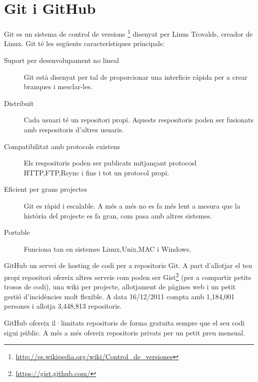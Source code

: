 \section{Git i GitHub}

Git es un sistema de control de versions \footnote{\url{http://es.wikipedia.org/wiki/Control_de_versiones}} disenyat per Linus Trovalds, creador de Linux. Git té les següents característiques principals: 

\begin{description}
    \item[Suport per desenvolupament no lineal] Git està disenyat per tal de proporcionar una interficie rápida per a crear branques i mesclar-les.
    \item[Distribuït] Cada usuari té un repositori propi. Aquests respositoris poden ser fusionats amb respositoris d'altres usuaris.
    \item[Compatibilitat amb protocols existens] Els respositoris poden ser publicats mitjançant protocosl HTTP,FTP,Rsync i fins i tot un protocol propi.
    \item[Eficient per grans projectes] Git es ràpid i escalable. A més a més no es fa més lent a mesura que la història del projecte es fa gran, com pasa amb altres sistemes.
    \item[Portable] Funciona tan en sistemes Linux,Unix,MAC i Windows.
\end{description}

GitHub un servei de hosting de codi per a repositoris Git. A part d'allotjar el teu propi repositori ofereix altres serveis com poden ser Gist\footnote{\url{https://gist.github.com/}} (per a compartir petits trosos de codi), una wiki per projecte, allotjament de pàgines web i un petit gestió d'incidències molt flexible. A data 16/12/2011 compta amb 1,184,001 persones i allotja 3,448,813 repositoris.

GitHub ofereix il·limitats repositoris de forma gratuita sempre que el seu codi sigui públic. A més a més ofereix repositoris privats per un petit preu mensual. 



